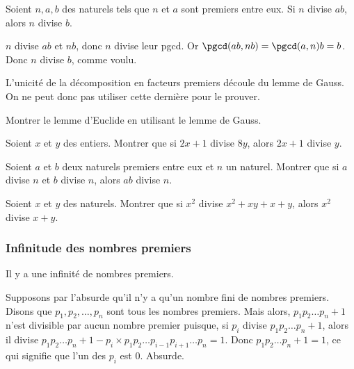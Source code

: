 \begin{thm}
Soient $n, a, b$ des naturels tels que $n$ et $a$ sont premiers entre eux. Si $n$ divise $ab$, alors $n$ divise $b$.
\end{thm}

\begin{preuve}
$n$ divise $ab$ et $nb$, donc $n$ divise leur pgcd. Or $\pgcd(ab, nb) = \pgcd(a, n)b = b$. Donc $n$ divise $b$, comme voulu.
\end{preuve}

\begin{rem}
L'unicité de la décomposition en facteurs premiers découle du lemme de Gauss. On ne peut donc pas utiliser cette dernière pour le prouver.
\end{rem}


\begin{exo}
Montrer le lemme d'Euclide en utilisant le lemme de Gauss.
\end{exo}


\begin{exo}
Soient $x$ et $y$ des entiers. Montrer que si $2x+1$ divise $8y$, alors $2x+1$ divise $y$.
\end{exo}


\begin{exo}
Soient $a$ et $b$ deux naturels premiers entre eux et $n$ un naturel. Montrer que si $a$ divise $n$ et $b$ divise $n$, alors $ab$ divise $n$.
\end{exo}


\begin{exo}
Soient $x$ et $y$ des naturels. Montrer que si $x^2$ divise $x^2 + xy + x + y$, alors $x^2$ divise $x+y$.
\end{exo}


\subsubsection{Infinitude des nombres premiers}


\begin{thm}
Il y a une infinité de nombres premiers.
\end{thm}

\begin{preuve}
Supposons par l'absurde qu'il n'y a qu'un nombre fini de nombres premiers. Disons que $p_1, p_2, \dots, p_n$ sont tous les nombres premiers. Mais alors, $p_1 p_2 \dots p_n + 1$ n'est divisible par aucun nombre premier puisque, si $p_i$ divise $p_1 p_2 \dots p_n + 1$, alors il divise $p_1 p_2 \dots p_n + 1 - p_i \times p_1 p_2 \dots p_{i-1} p_{i+1} \dots p_n = 1$. Donc $p_1 p_2 \dots p_n + 1 = 1$, ce qui signifie que l'un des $p_i$ est $0$. Absurde.
\end{preuve}


